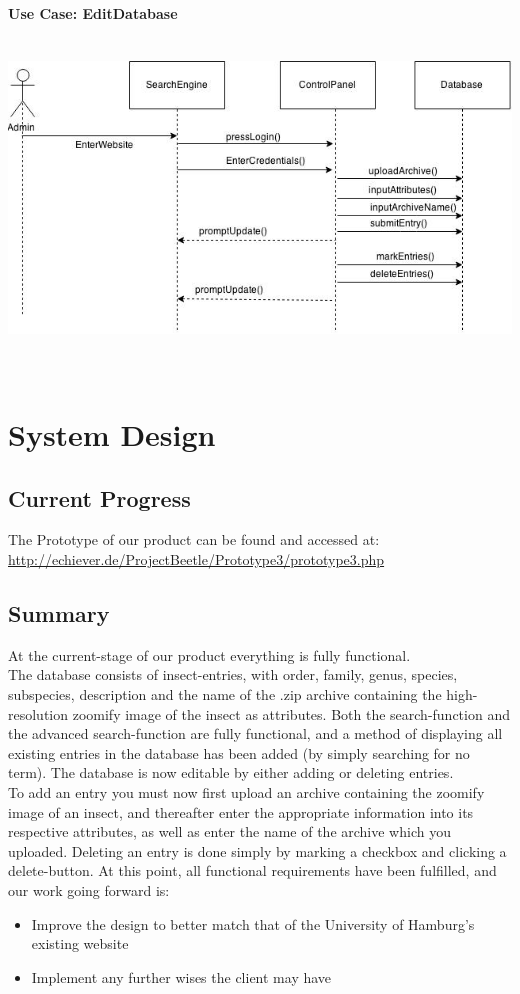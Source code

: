 \documentclass[12pt,a4paper]{article}
\begin{document}
{\bf Use Case: EditDatabase}\\

\includegraphics[height=92mm]{Sequence3.jpg}

\newpage

\section{System Design}
\subsection{Current Progress}

The Prototype of our product can be found and accessed at: \url{http://echiever.de/ProjectBeetle/Prototype3/prototype3.php}
\subsection{Summary}

At the current-stage of our product everything is fully functional.\\
The database consists of insect-entries, with order, family, genus, species, subspecies, description and the name of the .zip archive containing the high-resolution zoomify image of the insect as attributes.
Both the search-function and the advanced search-function are fully functional, and a method of displaying all existing entries in the database has been added (by simply searching for no term).
The database is now editable by either adding or deleting entries.\\
To add an entry you must now first upload an archive containing the zoomify image of an insect, and thereafter enter the appropriate information into its respective attributes, as well as enter the name of the archive which you uploaded.
Deleting an entry is done simply by marking a checkbox and clicking a delete-button.
At this point, all functional requirements have been fulfilled, and our work going forward is:
\begin{itemize}
\item Improve the design to better match that of the University of Hamburg's existing website
\item Implement any further wises the client may have
\end{itemize}
\newpage
\end{document}
